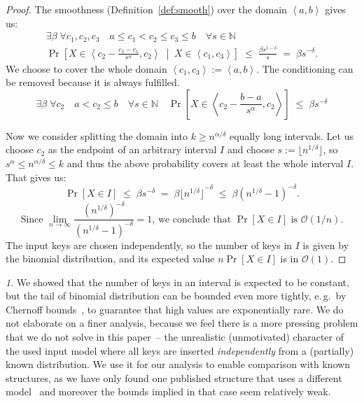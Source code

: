 \documentclass[
submission
]{dmtcs-episciences}
\theoremstyle{plain}
\theoremstyle{definition}
\theoremstyle{remark}
\newtheorem*{rem*}{\protect\remarkname}
\theoremstyle{plain}
\theoremstyle{plain}
\providecommand{\remarkname}{Remark}
\def\interval#1#2{\left\langle#1,#2\right\rangle}
\def\eqspaces{\;=\;}
\def\lespaces{\;\le\;}
\def\Prob#1{\Pr\!\left[#1\right]}
\def\OO{\mathcal O}
\def\natural{\mathbb{N}}
\begin{document}
\begin{proof}
The smoothness (Definition~\ref{def:smooth}) over the domain $\interval a b$ gives us:
\begin{multline*}
	\exists\beta \; \forall c_1,c_2,c_3 \quad a \le c_1 < c_2 \le c_3 \le b \quad \forall s \in \natural \\
		\Prob{  X \in \interval{ c_2 - \frac{c_3-c_1}{s^\alpha} }{c_2} \; \middle| \; X \in \interval{c_1}{c_3}  }
		\lespaces \frac{\beta s^{1-\delta}}{s}  \eqspaces  \beta s^{-\delta}.
\end{multline*}
We choose to cover the whole domain $\interval{c_1}{c_3} := \interval a b$. The conditioning can be removed because it is always fulfilled.
\[
	\exists\beta \; \forall c_2 \quad a < c_2 \le b \quad \forall s \in \natural \quad
		\Prob{  X \in \interval{ c_2 - \frac{b-a}{s^\alpha} }{c_2}  }
		\lespaces \beta s^{-\delta}
\]

Now we consider splitting the domain into $k \ge n^{\alpha / \delta}$ equally long intervals.
Let us choose $c_2$ as the endpoint of an arbitrary
interval $I$ and choose $s:= \lfloor n^{1 / \delta} \rfloor$, so
$ s^\alpha \le n^{\alpha / \delta} \le k $ and thus the above probability covers at least the whole interval $I$. That gives us:
\[	\Prob{X \in I} \lespaces \beta s^{-\delta}
	\eqspaces \beta {\lfloor n^{1 / \delta} \rfloor}^{-\delta}
	\lespaces \beta \left( n^{1 / \delta} - 1 \right) ^{-\delta}.
\] \[
\text{Since } \lim_{n \to \infty}
	\frac{ ( n^{1 / \delta} ) ^{-\delta} }{ ( n^{1 / \delta} - 1 ) ^{-\delta} }
	= 1 \text{, we conclude that } \Prob{X \in I} \text{ is } \OO(1/n).
\]
%
The input keys are chosen independently, so the number of keys in $I$ is given by the binomial distribution, and its expected value
$n \Prob{X \in I}$ is in $\OO(1)$.
\end{proof}

\begin{rem*}
We showed that the number of keys in an interval is expected to be constant, but the tail of binomial distribution can be bounded even more tightly, e.\,g.~by Chernoff bounds~\cite[chapter~4.1]{randomAlgs}, to guarantee that high values are exponentially rare.
We do not elaborate on a finer analysis, because we feel there is a more pressing problem that we do not solve in this paper~-- the unrealistic (unmotivated) character of the used input model where all keys are inserted \emph{independently} from a (partially) known distribution.
We use it for our analysis to enable comparison with known structures, as we have only found one published structure that uses a different model~\cite{DemaineJP04} and moreover the bounds implied in that case seem relatively weak.
\end{rem*}
\end{document}
